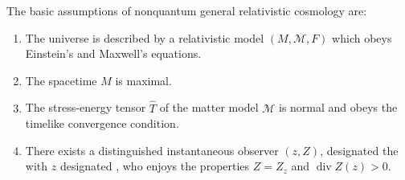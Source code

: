 The basic assumptions of nonquantum general relativistic cosmology are:

\begin{enumerate}
\item[(a)] The universe is described by a relativistic model $(M, \mathcal{M}, F)$ which obeys Einstein's and Maxwell's equations.
\item[(b)] The spacetime $M$ is maximal.
\item[(c)] The stress-energy tensor $\hat{T}$ of the matter model $\mathcal{M}$ is normal and obeys the timelike convergence condition.
\item[(d)] There exists a distinguished instantaneous observer $(z, Z)$, designated the  with $z$ designated , who enjoys the properties $Z = Z_z$ and $\operatorname{div} Z(z) > 0$.
\end{enumerate}
